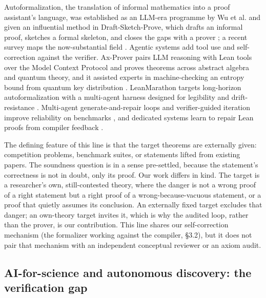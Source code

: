 \documentclass[11pt]{article}
\begin{document}
Autoformalization, the translation of informal mathematics into a proof assistant's language, was
established as an LLM-era programme by Wu et al. \cite{r8} and given an influential method in
Draft-Sketch-Prove, which drafts an informal proof, sketches a formal skeleton, and closes the gaps
with a prover \cite{r9}; a recent survey maps the now-substantial field \cite{r10}. Agentic systems add tool
use and self-correction against the verifier. Ax-Prover pairs LLM reasoning with Lean tools over the
Model Context Protocol and proves theorems across abstract algebra and quantum theory, and it
assisted experts in machine-checking an entropy bound from quantum key distribution \cite{r12}.
LeanMarathon targets long-horizon autoformalization with a multi-agent harness designed for
legibility and drift-resistance \cite{r13}. Multi-agent generate-and-repair loops and verifier-guided
iteration improve reliability on benchmarks \cite{r14,r15}, and dedicated systems learn to repair Lean
proofs from compiler feedback \cite{r16}.

The defining feature of this line is that the target theorems are externally given: competition
problems, benchmark suites, or statements lifted from existing papers. The soundness question is in
a sense pre-settled, because the statement's correctness is not in doubt, only its proof. Our work
differs in kind. The target is a researcher's own, still-contested theory, where the danger is not
a wrong proof of a right statement but a right proof of a wrong-because-vacuous statement, or a
proof that quietly assumes its conclusion. An externally fixed target excludes that danger; an
own-theory target invites it, which is why the audited loop, rather than the prover, is our
contribution. This line shares our self-correction mechanism (the formalizer working against the
compiler, §3.2), but it does not pair that mechanism with an independent conceptual reviewer or an
axiom audit.

\subsection{AI-for-science and autonomous discovery: the verification gap}
\end{document}
